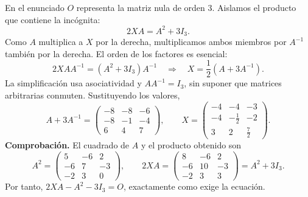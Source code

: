 En el enunciado $O$ representa la matriz nula de orden 3. Aislamos el producto que contiene la incógnita:
\[
2XA=A^2+3I_3.
\]
Como $A$ multiplica a $X$ por la derecha, multiplicamos ambos miembros por $A^{-1}$ también por la derecha. El orden de los factores es esencial:
\[
2XAA^{-1}=(A^2+3I_3)A^{-1}
\quad\Longrightarrow\quad
X=\frac12(A+3A^{-1}).
\]
La simplificación usa asociatividad y $AA^{-1}=I_3$, sin suponer que matrices arbitrarias conmuten. Sustituyendo los valores,
\[
A+3A^{-1}=\begin{pmatrix}-8&-8&-6\\-8&-1&-4\\6&4&7\end{pmatrix},
\qquad
\boxed{X=\begin{pmatrix}-4&-4&-3\\-4&-\frac12&-2\\3&2&\frac72\end{pmatrix}.}
\]
\textbf{Comprobación.} El cuadrado de $A$ y el producto obtenido son
\[
A^2=\begin{pmatrix}5&-6&2\\-6&7&-3\\-2&3&0\end{pmatrix},\qquad
2XA=\begin{pmatrix}8&-6&2\\-6&10&-3\\-2&3&3\end{pmatrix}=A^2+3I_3.
\]
Por tanto, $2XA-A^2-3I_3=O$, exactamente como exige la ecuación.
